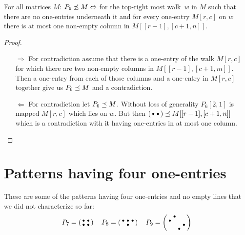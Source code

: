 \begin{thm}
For all matrices $M$: $P_6\not\preceq M\Leftrightarrow$ for the top-right most walk~$w$ in $M$ such that there are no one-entries underneath it and for every one-entry $M[r,c]$ on $w$ there is at most one non-empty column in $M[[r-1],[c+1,n]]$.
\end{thm}
\begin{proof}
\begin{itemize}
	\item[$\Rightarrow$] For contradiction assume that there is a one-entry of the walk $M[r,c]$ for which there are two non-empty columns in $M[[r-1],[c+1,m]]$. Then a one-entry from each of those columns and a one-entry in $M[r,c]$ together give us $P_6\preceq M$ and a contradiction. 
	\item[$\Leftarrow$] For contradiction let $P_6\preceq M$. Without loss of generality $P_6[2,1]$ is mapped $M[r,c]$ which lies on $w$. But then $\left(\begin{smallmatrix}\bullet&\bullet\end{smallmatrix}\right)\preceq M[[r-1],[c+1,n]]$ which is a contradiction with it having one-entries in at most one column.
\end{itemize}
\end{proof}

\section{Patterns having four one-entries}
\label{sec:4ones}
These are some of the patterns having four one-entries and no empty lines that we did not characterize so far:
$$P_7=\smm{\bullet&\bullet\\\bullet&\bullet}\ \ \ P_8=\smm{\bullet&\bullet&\bullet\\ &\bullet& }\ \ \ P_9=\smm{ &\bullet& & \\\bullet& & & \\ & & &\bullet\\ & &\bullet& }$$

